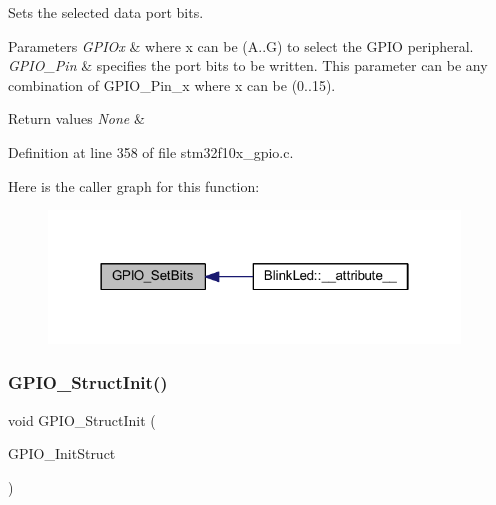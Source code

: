 Sets the selected data port bits. 


\begin{DoxyParams}{Parameters}
{\em G\+P\+I\+Ox} & where x can be (A..G) to select the G\+P\+IO peripheral. \\
\hline
{\em G\+P\+I\+O\+\_\+\+Pin} & specifies the port bits to be written. This parameter can be any combination of G\+P\+I\+O\+\_\+\+Pin\+\_\+x where x can be (0..15). \\
\hline
\end{DoxyParams}

\begin{DoxyRetVals}{Return values}
{\em None} & \\
\hline
\end{DoxyRetVals}


Definition at line 358 of file stm32f10x\+\_\+gpio.\+c.

Here is the caller graph for this function\+:
\nopagebreak
\begin{figure}[H]
\begin{center}
\leavevmode
\includegraphics[width=310pt]{group___g_p_i_o___exported___functions_ga9e1352eed7c6620e18af2d86f6b6ff8e_icgraph}
\end{center}
\end{figure}
\mbox{\label{group___g_p_i_o___exported___functions_gab28de41278e7f8c63d0851e2733b10df}} 
\subsubsection{\texorpdfstring{G\+P\+I\+O\+\_\+\+Struct\+Init()}{GPIO\_StructInit()}}
{\footnotesize\ttfamily void G\+P\+I\+O\+\_\+\+Struct\+Init (\begin{DoxyParamCaption}\item[{\hyperlink{struct_g_p_i_o___init_type_def}{G\+P\+I\+O\+\_\+\+Init\+Type\+Def} $\ast$}]{G\+P\+I\+O\+\_\+\+Init\+Struct }\end{DoxyParamCaption})}



